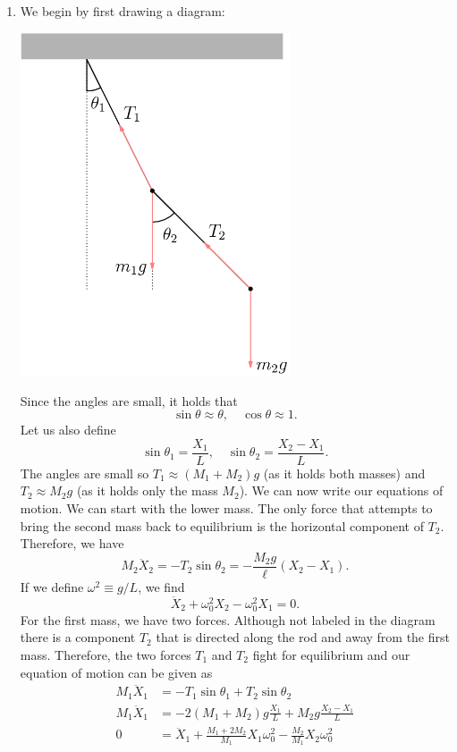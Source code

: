 \begin{sol}
\begin{enumerate}[label=\textbf{(\alph*)}] 
\item We begin by first drawing a diagram:
\begin{center}
    \includegraphics[width=8cm]{P03/double pendulum.png}
\end{center}
Since the angles are small, it holds that 
\[\sin\theta \approx \theta, \quad \cos\theta \approx 1.\]
Let us also define 
\[\sin\theta_1 = \frac{X_1}{L}, \quad \sin\theta_2 = \frac{X_2 - X_1}{L}.\]
The angles are small so $T_1 \approx (M_1 + M_2)g$ (as it holds both masses) and $T_2 \approx M_2 g$ (as it holds only the mass $M_2$). We can now write our equations of motion. We can start with the lower mass. The only force that attempts to bring the second mass back to
equilibrium is the horizontal component of $T_2$. Therefore, we have
\[M_2 \ddot{X}_2  = -T_2\sin\theta_2 = -\frac{M_2g}{\ell} (X_2 - X_1).\]
If we define $\omega^2 \equiv g/L$, we find 
\[\ddot{X}_2 + \omega_0^2 X_2 - \omega_0^2 X_1 = 0.\]
For the first mass, we have two forces. Although not labeled in the diagram there is a component $T_2$ that is directed along the rod and away from the first mass. Therefore, the two forces $T_1$ and $T_2$ fight for equilibrium and our equation of motion can be given as 
\begin{align*}
    M_1\ddot{X}_1 &= -T_1 \sin\theta_1 + T_2 \sin \theta_2 \\ 
     M_1 \ddot{X}_1 &= -2(M_1 + M_2)g \frac{X_1}{L} + M_2g\frac{X_2 - X_1}{L} \\
   0 &= \ddot{X}_1 + \frac{M_1 + 2M_2}{M_1}X_1\omega_0^2 - \frac{M_2}{M_1}X_2 \omega_0^2 
\end{align*}


\end{enumerate}
\end{sol}
